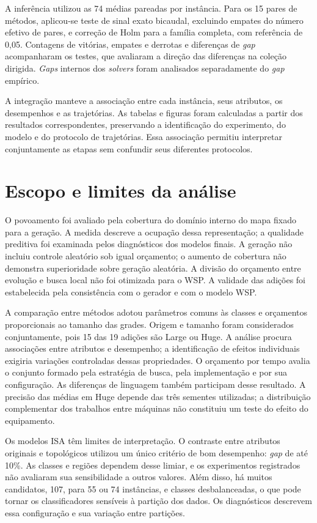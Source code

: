 A inferência utilizou as 74 médias pareadas por instância. Para os
15 pares de métodos, aplicou-se teste de sinal exato bicaudal, excluindo
empates do número efetivo de pares, e correção de Holm para a família
completa, com referência de 0,05. Contagens de vitórias, empates e derrotas
e diferenças de \textit{gap} acompanharam os testes, que avaliaram
a direção das diferenças na coleção dirigida.
\textit{Gaps} internos dos \textit{solvers} foram analisados separadamente do \textit{gap} empírico.

A integração manteve a associação entre cada instância, seus atributos,
os desempenhos e as trajetórias. As tabelas e figuras foram calculadas a
partir dos resultados correspondentes, preservando a identificação do
experimento, do modelo e do protocolo de trajetórias. Essa associação permitiu
interpretar conjuntamente as etapas sem confundir seus diferentes protocolos.

\section{Escopo e limites da análise}\label{sec:met-limitacoes}

O povoamento foi avaliado pela cobertura do domínio interno do mapa
fixado para a geração. A medida descreve a ocupação dessa representação;
a qualidade preditiva foi examinada pelos diagnósticos dos modelos finais.
A geração não incluiu controle aleatório sob igual orçamento;
o aumento de cobertura não demonstra superioridade sobre geração aleatória.
A divisão do orçamento entre evolução e busca local não foi otimizada para o WSP.
A validade das adições foi estabelecida pela consistência com o gerador e com o modelo WSP.

A comparação entre métodos adotou parâmetros comuns às classes e
orçamentos proporcionais ao tamanho das grades. Origem e tamanho foram
considerados conjuntamente, pois 15 das 19 adições são Large ou Huge.
A análise procura associações entre atributos e desempenho; a identificação
de efeitos individuais exigiria variações controladas dessas propriedades.
O orçamento por tempo avalia o conjunto formado pela estratégia de busca,
pela implementação e por sua configuração. As diferenças de linguagem
também participam desse resultado.
A precisão das médias em Huge depende das três sementes utilizadas;
a distribuição complementar dos trabalhos entre máquinas não constituiu
um teste do efeito do equipamento.

Os modelos ISA têm limites de interpretação. O contraste entre atributos
originais e topológicos utilizou um único critério de bom desempenho:
\textit{gap} de até 10\%. As classes e regiões dependem desse limiar, e
os experimentos registrados não avaliaram sua sensibilidade a outros
valores. Além disso, há muitos candidatos, 107, para 55 ou 74 instâncias,
e classes desbalanceadas, o que pode tornar os classificadores sensíveis
à partição dos dados. Os diagnósticos descrevem essa configuração e sua
variação entre partições.

